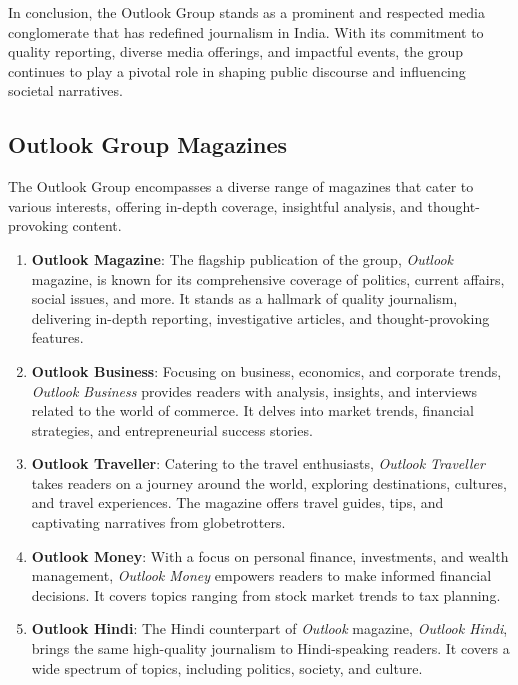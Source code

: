 In conclusion, the Outlook Group stands as a prominent and respected media conglomerate that has redefined journalism in India. With its commitment to quality reporting, diverse media offerings, and impactful events, the group continues to play a pivotal role in shaping public discourse and influencing societal narratives.

\subsection{Outlook Group Magazines}

The Outlook Group encompasses a diverse range of magazines that cater to various interests, offering in-depth coverage, insightful analysis, and thought-provoking content.

\begin{enumerate}
\item \textbf{Outlook Magazine}: The flagship publication of the group, \textit{Outlook} magazine, is known for its comprehensive coverage of politics, current affairs, social issues, and more. It stands as a hallmark of quality journalism, delivering in-depth reporting, investigative articles, and thought-provoking features.

\item \textbf{Outlook Business}: Focusing on business, economics, and corporate trends, \textit{Outlook Business} provides readers with analysis, insights, and interviews related to the world of commerce. It delves into market trends, financial strategies, and entrepreneurial success stories.

\item \textbf{Outlook Traveller}: Catering to the travel enthusiasts, \textit{Outlook Traveller} takes readers on a journey around the world, exploring destinations, cultures, and travel experiences. The magazine offers travel guides, tips, and captivating narratives from globetrotters.

\item \textbf{Outlook Money}: With a focus on personal finance, investments, and wealth management, \textit{Outlook Money} empowers readers to make informed financial decisions. It covers topics ranging from stock market trends to tax planning.

\item \textbf{Outlook Hindi}: The Hindi counterpart of \textit{Outlook} magazine, \textit{Outlook Hindi}, brings the same high-quality journalism to Hindi-speaking readers. It covers a wide spectrum of topics, including politics, society, and culture.
\end{enumerate}

